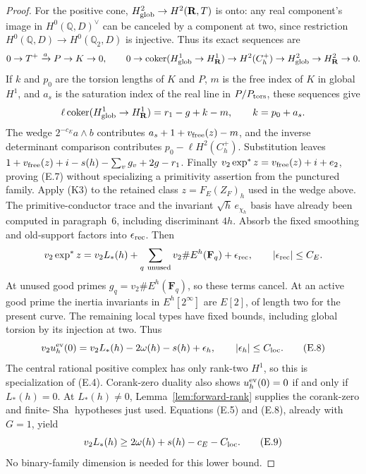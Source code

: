 \documentclass[11pt]{article}
\theoremstyle{definition}
\theoremstyle{remark}
\newcommand{\Q}{\mathbb Q}
\newcommand{\Sha}{\operatorname{Sha}}
\begin{document}
\begin{proof}
For the positive cone, $H^2_{\rm glob}\to H^2(\mathbf R,T)$ is onto:
any real component's image in $H^0(\Q,D)^\vee$ can be canceled by
a component at two, since restriction
$H^0(\Q,D)\to H^0(\Q_2,D)$ is injective. Thus its exact sequences are
\[
0\to T^+\xrightarrow{a}P\to K\to0,\qquad
0\to\operatorname{coker}(H^1_{\rm glob}\to H^1_{\mathbf R})
 \to H^2(C_h^+)\to H^2_{\rm glob}\to H^2_{\mathbf R}\to0.
\]
If $k$ and $p_0$ are the torsion lengths of $K$ and $P$, $m$ is the
free index of $K$ in global $H^1$, and $a_s$ is the saturation index
of the real line in $P/P_{\rm tors}$, these sequences give
\[
\ell\operatorname{coker}(H^1_{\rm glob}\to H^1_{\mathbf R})
 =r_1-g+k-m,\qquad k=p_0+a_s.
\]
The wedge $2^{-c_E}a\wedge b$ contributes
$a_s+1+v_{\rm free}(z)-m$, and the inverse determinant comparison
contributes $p_0-\ell H^2(C_h^+)$. Substitution leaves
$1+v_{\rm free}(z)+i-s(h)-\sum_vg_v+2g-r_1$.
Finally $v_2\exp^*z=v_{\rm free}(z)+i+e_2$, proving (E.7)
without specializing a primitivity assertion from the punctured
family.
Apply (K3) to the retained class $z=F_E(Z_F)_h$ used in the wedge
above. The primitive-conductor trace and the invariant
$\sqrt h\,e_{\chi_h}$ basis have already been computed in
paragraph~6, including discriminant $4h$. Absorb the fixed
smoothing and old-support factors into $\epsilon_{\rm rec}$.
Then
\[
 v_2\exp^*z
 =v_2L_*(h)+\sum_{q\ {\rm unused}}v_2\#E^h(\mathbf F_q)
                         +\epsilon_{\rm rec},\qquad
 |\epsilon_{\rm rec}|\le C_E.
\]
At unused good primes $g_q=v_2\#E^h(\mathbf F_q)$, so these
terms cancel. At an active good prime the inertia invariants in
$E^h[2^\infty]$ are $E[2]$, of length two for the present curve.
The remaining local types have fixed bounds, including global
torsion by its injection at two.
Thus
\[
 v_2u_h^{\rm ev}(0)=v_2L_*(h)-2\omega(h)-s(h)+\epsilon_h,\qquad
 |\epsilon_h|\le C_{\rm loc}.                                  \tag{E.8}
\]
The central rational positive complex has only rank-two $H^1$, so
this is specialization of (E.4). Corank-zero duality also shows
$u_h^{\rm ev}(0)=0$ if and only if $L_*(h)=0$.
At $L_*(h)\ne0$, Lemma~\ref{lem:forward-rank} supplies the
corank-zero and finite-$\Sha$ hypotheses just used.
Equations (E.5) and (E.8), already with $G=1$, yield
\[
          v_2L_*(h)\ge2\omega(h)+s(h)-c_E-C_{\rm loc}.             \tag{E.9}
\]
No binary-family dimension is needed for this lower bound.
\end{proof}

\end{document}
